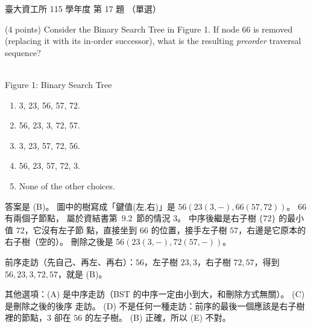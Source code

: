 \begin{pastexam}[label={px:ntu-115-dsa-17}]{臺大資工所 115 學年度 第 17 題}
（單選）

(4 points) Consider the Binary Search Tree in Figure 1. If node 66 is removed (replacing it with its in-order successor), what is the resulting \textit{preorder} traversal sequence?
\begin{center}
\\[2pt]
Figure 1: Binary Search Tree
\end{center}
\begin{enumerate}[label=(\Alph*)]
\item 3, 23, 56, 57, 72.
\item 56, 23, 3, 72, 57.
\item 3, 23, 57, 72, 56.
\item 56, 23, 57, 72, 3.
\item None of the other choices.
\end{enumerate}
\end{pastexam}

\begin{pastsoln}
答案是 (B)。 圖中的樹寫成「鍵值(左,右)」是 $56(23(3,-),66(57,72))$。 $66$ 有兩個子節點，
屬於資結書第~9.2~節的情況 3。 中序後繼是右子樹 $\{72\}$ 的最小值 $72$，它沒有左子節
點，直接坐到 $66$ 的位置，接手左子樹 $57$，右邊是它原本的右子樹（空的）。 刪除之後是
$56(23(3,-),72(57,-))$。

前序走訪（先自己、再左、再右）：$56$，左子樹 $23, 3$，右子樹 $72, 57$，得到
$56, 23, 3, 72, 57$，就是 (B)。

其他選項：(A) 是中序走訪（BST 的中序一定由小到大，和刪除方式無關）。 (C) 是刪除之後的後序
走訪。 (D) 不是任何一種走訪：前序的最後一個應該是右子樹裡的節點，$3$ 卻在 $56$ 的左子樹。
(B) 正確，所以 (E) 不對。
\end{pastsoln}
